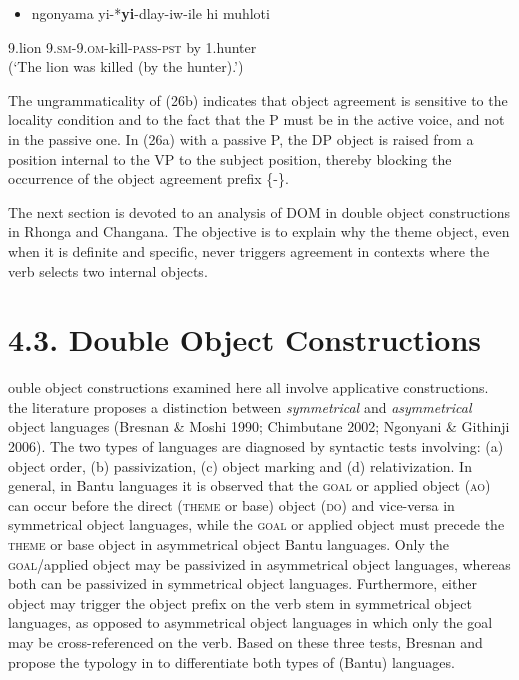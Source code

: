 \documentclass[output=paper]{langsci/langscibook}
\begin{document}
\begin{itemize}
\item \gll *ngonyama          yi-*\textbf{yi}{}-dlay-iw-ile                  hi       muhloti\\
\end{itemize}
     9.lion                   9.\textsc{sm-9.om}{}-kill-\textsc{pass-pst}       by      1.hunter\\
\glt (‘The lion was killed (by the hunter).’)
\z

The ungrammaticality of (26b) indicates that object agreement is sensitive to the locality condition and to the fact that the P must be in the active voice, and not in the passive one. In (26a) with a passive P, the DP object is raised from a position internal to the VP to the subject position, thereby blocking the occurrence of the object agreement prefix \{-\}.

The next section is devoted to an analysis of DOM in double object constructions in Rhonga and Changana. The objective is to explain why the theme object, even when it is definite and specific, never triggers agreement in contexts where the verb selects two internal objects.

\section{4.3. Double Object Constructions}

ouble object constructions examined here all involve applicative constructions. the literature proposes a distinction between \textit{symmetrical} and \textit{asymmetrical} object languages (Bresnan \& Moshi 1990; Chimbutane 2002; Ngonyani \& Githinji 2006). The two types of languages are diagnosed by syntactic tests involving: (a) object order, (b) passivization, (c) object marking and (d) relativization. In general, in Bantu languages it is observed that the \textsc{goal} or applied object (\textsc{ao}) can occur before the direct (\textsc{theme} or base) object (\textsc{do}) and vice-versa in symmetrical object languages, while the \textsc{goal} or applied object must precede the \textsc{theme} or base object in asymmetrical object Bantu languages. Only the \textsc{goal}/applied object may be passivized in asymmetrical object languages, whereas both can be passivized in symmetrical object languages. Furthermore, either object may trigger the object prefix on the verb stem in symmetrical object languages, as opposed to asymmetrical object languages in which only the goal may be cross-referenced on the verb. Based on these three tests, Bresnan and \citet{Moshi1990} propose the typology in  to differentiate both types of (Bantu) languages.
\end{document}
